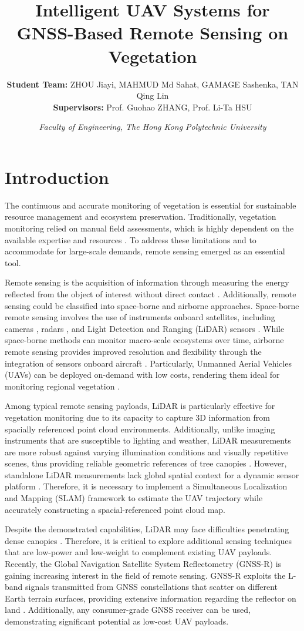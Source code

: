 \documentclass[10pt, a4paper]{article}
\title{\Large \textbf{Intelligent UAV Systems for GNSS-Based Remote Sensing on Vegetation}}
\author{
    \normalsize\textbf{Student Team: }ZHOU Jiayi, MAHMUD Md Sahat, GAMAGE Sashenka, TAN Qing Lin \\
    \normalsize\textbf{Supervisors: }Prof. Guohao ZHANG, Prof. Li-Ta HSU
}
\date{\normalsize
    \it{Faculty of Engineering, The Hong Kong Polytechnic University}
}
\begin{document}
\maketitle

\section{Introduction}
The continuous and accurate monitoring of vegetation is essential for sustainable resource management and ecosystem preservation. Traditionally, vegetation monitoring relied on manual field assessments, which is highly dependent on the available expertise and resources \cite{Gibbons2006, Parkes2003}. To address these limitations and to accommodate for large-scale demands, remote sensing emerged as an essential tool.  

Remote sensing is the acquisition of information through measuring the energy reflected from the object of interest without direct contact \cite{campbell2011introduction}. Additionally, remote sensing could be classified into space-borne and airborne approaches. Space-borne remote sensing involves the use of instruments onboard satellites, including cameras \cite{Qian2022}, radars \cite{Hu2025}, and Light Detection and Ranging (LiDAR) sensors \cite{Bergen2009}. While space-borne methods can monitor macro-scale ecosystems over time, airborne remote sensing provides improved resolution and flexibility through the integration of sensors onboard aircraft \cite{Khan2024}. Particularly, Unmanned Aerial Vehicles (UAVs) can be deployed on-demand with low costs, rendering them ideal for monitoring regional vegetation \cite{Tang2015}.

Among typical remote sensing payloads, LiDAR is particularly effective for vegetation monitoring due to its capacity to capture 3D information from spacially referenced point cloud environments. Additionally, unlike imaging instruments that are susceptible to lighting and weather, LiDAR measurements are more robust against varying illumination conditions and visually repetitive scenes, thus providing reliable geometric references of tree canopies \cite{Wu2024, jiang2025gps}. However, standalone LiDAR measurements lack global spatial context for a dynamic sensor platform \cite{wang2026multi}. Therefore, it is necessary to implement a Simultaneous Localization and Mapping (SLAM) framework to estimate the UAV trajectory while accurately constructing a spacial-referenced point cloud map.

Despite the demonstrated capabilities, LiDAR may face difficulties penetrating dense canopies \cite{Su2007}. Therefore, it is critical to explore additional sensing techniques that are low-power and low-weight to complement existing UAV payloads. Recently, the Global Navigation Satellite System Reflectometry (GNSS-R) is gaining increasing interest in the field of remote sensing. GNSS-R exploits the L-band signals transmitted from GNSS constellations that scatter on different Earth terrain surfaces, providing extensive information regarding the reflector on land \cite{Jin2024}. Additionally, any consumer-grade GNSS receiver can be used, demonstrating significant potential as low-cost UAV payloads.
\end{document}
